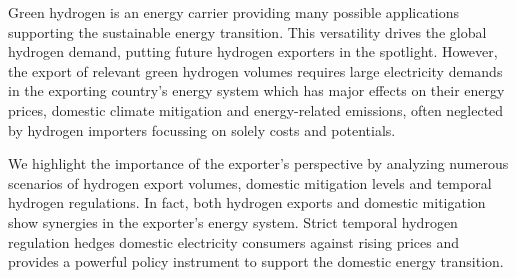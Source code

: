 
Green hydrogen is an energy carrier providing many possible applications supporting the sustainable energy transition. 
This versatility drives the global hydrogen demand, putting future hydrogen exporters in the spotlight. 
However, the export of relevant green hydrogen volumes requires large electricity demands in the exporting country's energy system which has major effects on their energy prices, domestic climate mitigation and energy-related emissions, often neglected by hydrogen importers focussing on solely costs and potentials.

We highlight the importance of the exporter's perspective by analyzing numerous scenarios of hydrogen export volumes, domestic mitigation levels and temporal hydrogen regulations. In fact, both hydrogen exports and domestic mitigation show synergies in the exporter's energy system. 
Strict temporal hydrogen regulation hedges domestic electricity consumers against rising prices and provides a powerful policy instrument to support the domestic energy transition.


